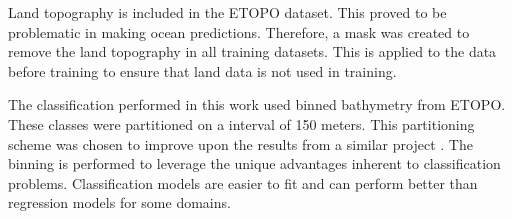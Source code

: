 \par
Land topography is included in the \ac{ETOPO} dataset.
This proved to be problematic in making ocean predictions.
Therefore, a mask was created to remove the land topography in all training datasets.
This is applied to the data before training to ensure that land data is not used in training.

\par
The classification performed in this work used binned bathymetry from \ac{ETOPO}.
These classes were partitioned on a interval of 150 meters.
This partitioning scheme was chosen to improve upon the results from a similar project \cite{jena2012prediction}.
The binning is performed to leverage the unique advantages inherent to classification problems.
Classification models are easier to fit and can perform better than regression models for some domains.